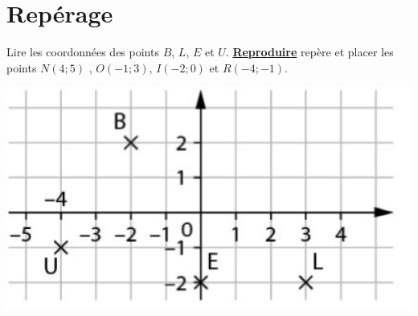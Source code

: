\section{Repérage}

\begin{questions}
	\question Lire les coordonnées des points $B$, $L$, $E$ et $U$.
	\question \textbf{\underline{Reproduire}} repère et placer les points $N(4;5)$ , $O(-1;3)$, $I(-2;0)$ et $R(-4;-1)$.
	
	\begin{center}
		\includegraphics[scale=0.25]{img/repere}	
	\end{center}
	
\end{questions}